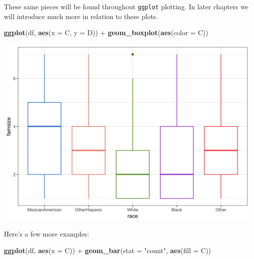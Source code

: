 \documentclass[]{tufte-book}
\newenvironment{Shaded}{}{}
\newcommand{\KeywordTok}[1]{\textcolor[rgb]{0.00,0.44,0.13}{\textbf{#1}}}
\newcommand{\DataTypeTok}[1]{\textcolor[rgb]{0.56,0.13,0.00}{#1}}
\newcommand{\StringTok}[1]{\textcolor[rgb]{0.25,0.44,0.63}{#1}}
\newcommand{\OperatorTok}[1]{\textcolor[rgb]{0.40,0.40,0.40}{#1}}
\newcommand{\NormalTok}[1]{#1}
\theoremstyle{definition}
\theoremstyle{definition}
\theoremstyle{remark}
\begin{document}
These same pieces will be found throughout \texttt{ggplot} plotting. In
later chapters we will introduce much more in relation to these plots.

\begin{Shaded}
\begin{Highlighting}[]
\KeywordTok{ggplot}\NormalTok{(df, }\KeywordTok{aes}\NormalTok{(}\DataTypeTok{x =}\NormalTok{ C, }\DataTypeTok{y =}\NormalTok{ D)) }\OperatorTok{+}\StringTok{ }\KeywordTok{geom_boxplot}\NormalTok{(}\KeywordTok{aes}\NormalTok{(}\DataTypeTok{color =}\NormalTok{ C))}
\end{Highlighting}
\end{Shaded}

\includegraphics{_main_files/figure-latex/unnamed-chunk-62-1}

Here's a few more examples:

\begin{Shaded}
\begin{Highlighting}[]
\KeywordTok{ggplot}\NormalTok{(df, }\KeywordTok{aes}\NormalTok{(}\DataTypeTok{x =}\NormalTok{ C)) }\OperatorTok{+}\StringTok{ }\KeywordTok{geom_bar}\NormalTok{(}\DataTypeTok{stat =} \StringTok{"count"}\NormalTok{, }
    \KeywordTok{aes}\NormalTok{(}\DataTypeTok{fill =}\NormalTok{ C))}
\end{Highlighting}
\end{Shaded}
\end{document}
